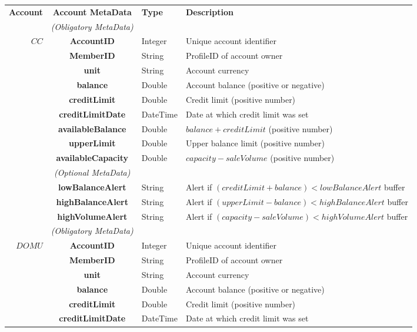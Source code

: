 \begin{table}[H]
\begin{centering}
\small
{
\begin{tabular}{ r | c | l | l }
\textbf{Account}	& {\bf Account MetaData} & {\bf Type} & {\bf Description} \\
\Xhline{1.5pt}
			 & \emph{(Obligatory MetaData)}& & \\
\cline{2-2}
$CC$		& {\bf AccountID}			&Integer	& Unique account identifier \\
			& {\bf MemberID}			&String	& ProfileID of account owner \\
			& {\bf unit}					&String	& Account currency \\
			& {\bf balance}				&Double	& Account balance (positive or negative) \\
			& {\bf creditLimit}			&Double	& Credit limit (positive number) \\
			& {\bf creditLimitDate}		&DateTime & Date at which credit limit was set \\
			& {\bf availableBalance}		&Double	& $balance + creditLimit$ (positive number) \\
			& {\bf upperLimit}			&Double	& Upper balance limit (positive number) \\
			& {\bf availableCapacity}		&Double	& $capacity - saleVolume$ (positive number) \\
\cline{2-2}
			 & \emph{(Optional MetaData)}& & \\
\cline{2-2}
			& {\bf lowBalanceAlert}		&String	& Alert if $(creditLimit + balance) < lowBalanceAlert$ buffer \\
			& {\bf highBalanceAlert}		&String	& Alert if $(upperLimit - balance) < highBalanceAlert$ buffer \\
			& {\bf highVolumeAlert}		&String	& Alert if $(capacity - saleVolume) < highVolumeAlert$ buffer \\
\Xhline{1.5pt}
			 & \emph{(Obligatory MetaData)}& & \\
\cline{2-2}
$DOMU$		& {\bf AccountID}			&Integer	& Unique account identifier \\
			& {\bf MemberID}			&String	& ProfileID of account owner \\
			& {\bf unit}					&String	& Account currency \\
			& {\bf balance}				&Double	& Account balance (positive or negative) \\
			& {\bf creditLimit}			&Double	& Credit limit (positive number) \\
			& {\bf creditLimitDate}		&DateTime & Date at which credit limit was set \\

\end{tabular}}
\end{centering}
\end{table}
